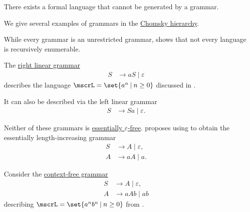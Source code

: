 \begin{proposition}\label{thm:non_recursively_enumerable_language}
  There exists a formal language that cannot be generated by a grammar.
\end{proposition}

\begin{example}\label{ex:def:chomsky_hierarchy}
  We give several examples of grammars in the \hyperref[def:chomsky_hierarchy]{Chomsky hierarchy}.

  \begin{thmenum}
     While every grammar is an unrestricted grammar,  shows that not every language is recursively enumerable.

     The \hyperref[def:chomsky_hierarchy/regular]{right linear grammar}
    \begin{equation*}
      \begin{aligned}
        S &\to aS \mid \varepsilon
      \end{aligned}
    \end{equation*}
    describes the language \( \mscrL = \set{ a^n \given n \geq 0 } \) discussed in .

    It can also be described via the left linear grammar
    \begin{equation*}
      \begin{aligned}
        S &\to Sa \mid \varepsilon.
      \end{aligned}
    \end{equation*}

    Neither of these grammars is \hyperref[def:epsilon_free_grammar]{essentially \( \varepsilon \)-free}.  proposes using  to obtain the essentially length-increasing grammar
    \begin{equation*}
      \begin{aligned}
        S &\to A \mid \varepsilon, \\
        A &\to aA \mid a.
      \end{aligned}
    \end{equation*}

     Consider the \hyperref[def:chomsky_hierarchy/context_free]{context-free grammar}
    \begin{equation*}
      \begin{aligned}
        S &\to A \mid \varepsilon, \\
        A &\to aAb \mid ab
      \end{aligned}
    \end{equation*}
    describing \( \mscrL = \set{ a^n b^n \given n \geq 0 } \) from .


\end{thmenum}
\end{example}
